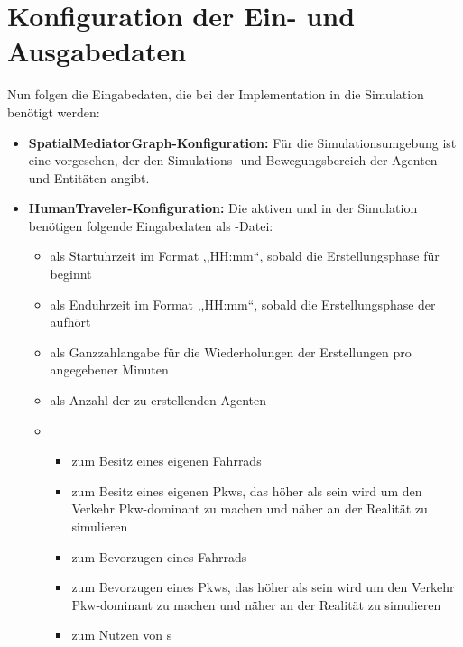 %


\section{Konfiguration der Ein- und Ausgabedaten}\label{sec:input-output-configuration}

Nun folgen die Eingabedaten, die bei der Implementation in die Simulation benötigt werden:

\begin{itemize}
    \item \textbf{SpatialMediatorGraph-Konfiguration:} Für die Simulationsumgebung ist eine  vorgesehen, der den Simulations- und Bewegungsbereich der Agenten und Entitäten angibt.
    \item \textbf{HumanTraveler-Konfiguration:} Die aktiven  und  in der Simulation benötigen folgende Eingabedaten als -Datei:
    \begin{itemize}
        \item {} als Startuhrzeit im Format ,,HH:mm``, sobald die Erstellungsphase für  beginnt
        \item {} als Enduhrzeit im Format ,,HH:mm``, sobald die Erstellungsphase der  aufhört
        \item {} als Ganzzahlangabe für die Wiederholungen der Erstellungen pro angegebener Minuten
        \item {} als Anzahl der zu erstellenden Agenten
        \item {}
        \begin{itemize}
            \item {} zum Besitz eines eigenen Fahrrads
            \item {} zum Besitz eines eigenen Pkws, das höher als  sein wird um den Verkehr Pkw-dominant zu machen und näher an der Realität zu simulieren
            \item {} zum Bevorzugen eines Fahrrads
            \item {} zum Bevorzugen eines Pkws, das höher als  sein wird um den Verkehr Pkw-dominant zu machen und näher an der Realität zu simulieren
            \item {} zum Nutzen von s

\end{itemize}
\end{itemize}
\end{itemize}
